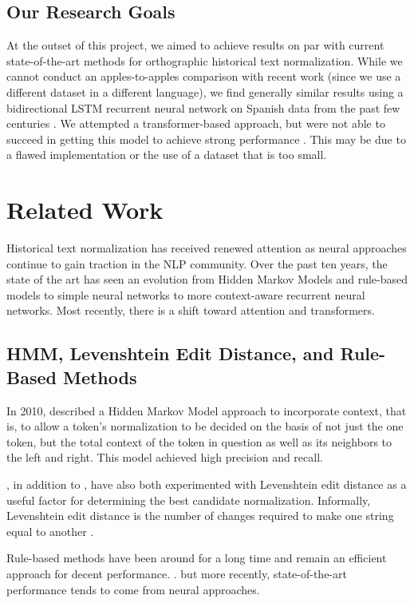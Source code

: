 \documentclass[11pt,a4paper]{article}
\begin{document}
\subsection{Our Research Goals}
At the outset of this project, we aimed to achieve results on par with current state-of-the-art methods for orthographic historical text normalization. While we cannot conduct an apples-to-apples comparison with recent work (since we use a different dataset in a different language), we find generally similar results using a bidirectional LSTM recurrent neural network on Spanish data from the past few centuries \cite{graves_framewise_2005}. We attempted a transformer-based approach, but were not able to succeed in getting this model to achieve strong performance \cite{vaswani_attention_2017}. This may be due to a flawed implementation or the use of a dataset that is too small.

\section{Related Work}
Historical text normalization has received renewed attention as neural approaches continue to gain traction in the NLP community. Over the past ten years, the state of the art has seen an evolution from Hidden Markov Models and rule-based models to simple neural networks to more context-aware recurrent neural networks. Most recently, there is a shift toward attention and transformers.

\subsection{HMM, Levenshtein Edit Distance, and Rule-Based Methods}
In 2010, \citeauthor{jurish_more_2010} described a Hidden Markov Model approach to incorporate context, that is, to allow a token's normalization to be decided on the basis of not just the one token, but the total context of the token in question as well as its neighbors to the left and right. This model achieved high precision and recall.

\citeauthor{jurish_comparing_2010}, in addition to \citeauthor{pettersson_normalisation_2013}, have also both experimented with Levenshtein edit distance as a useful factor for determining the best candidate normalization. Informally, Levenshtein edit distance is the number of changes required to make one string equal to another \cite{levenshtein_binary_1966}. 

Rule-based methods have been around for a long time and remain an efficient approach for decent performance. \cite{bollmann_rule-based_2011, pettersson_spelling_2016, zeldes_nlp_2016, schneider_comparing_2017}. but more recently, state-of-the-art performance tends to come from neural approaches.
\end{document}
